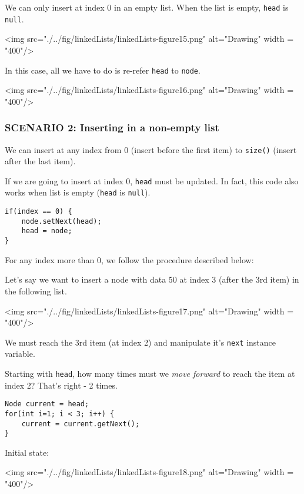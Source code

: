 We can only insert at index 0 in an empty list. When the list is empty, \texttt{head} is \texttt{null}.

\vskip 0.5cm

<img src="./../fig/linkedLists/linkedLists-figure15.png" alt="Drawing" width = "400"/>

\vskip 0.5cm

In this case, all we have to do is re-refer \texttt{head} to \texttt{node}.

\vskip 0.5cm

<img src="./../fig/linkedLists/linkedLists-figure16.png" alt="Drawing" width = "400"/>

\newpage

\subsubsection{SCENARIO 2: Inserting in a non-empty list}

We can insert at any index from 0 (insert before the first item) to \texttt{size()} (insert after the last item).

If we are going to insert at index 0, \texttt{head} must be updated. In fact, this code also works when list is empty (\texttt{head} is \texttt{null}).

\begin{lstlisting}
if(index == 0) {
	node.setNext(head);
	head = node;
}
\end{lstlisting}

For any index more than 0, we follow the procedure described below:

Let's say we want to insert a node with data 50 at index 3 (after the 3rd item) in the following list.

\vskip 0.5cm

<img src="./../fig/linkedLists/linkedLists-figure17.png" alt="Drawing" width = "400"/>

We must reach the 3rd item (at index 2) and manipulate it's \texttt{next} instance variable.

Starting with \texttt{head}, how many times must we \emph{move forward} to reach the item at index 2? That's right - 2 times.

\begin{lstlisting}
Node current = head;
for(int i=1; i < 3; i++) {
	current = current.getNext();
}
\end{lstlisting}

Initial state:
\vskip 0.5cm

<img src="./../fig/linkedLists/linkedLists-figure18.png" alt="Drawing" width = "400"/>

